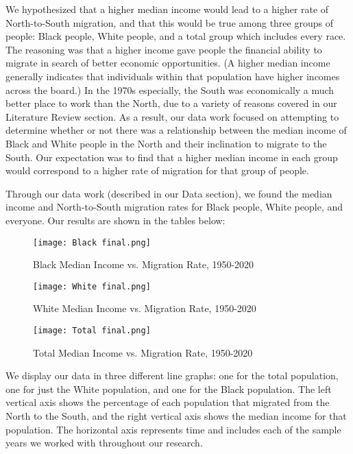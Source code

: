 \documentclass[12pt]{article}
\begin{document}
We hypothesized that a higher median income would lead to a higher rate of North-to-South migration, and that this would be true among three groups of people: Black people, White people, and a total group which includes every race. The reasoning was that a higher income gave people the financial ability to migrate in search of better economic opportunities. (A higher median income generally indicates that individuals within that population have higher incomes across the board.) In the 1970s especially, the South was economically a much better place to work than the North, due to a variety of reasons covered in our Literature Review section. As a result, our data work focused on attempting to determine whether or not there was a relationship between the median income of Black and White people in the North and their inclination to migrate to the South. Our expectation was to find that a higher median income in each group would correspond to a higher rate of migration for that group of people.  

Through our data work (described in our Data section), we found the median income and North-to-South migration rates for Black people, White people, and everyone. Our results are shown in the tables below:  

 \begin{figure}[h]
     \centering
     \texttt{[image: Black final.png]}
     \caption{Black Median Income vs. Migration Rate, 1950-2020}
     \label{Figure 1}
 \end{figure}

 \begin{figure}[h]
     \centering
     \texttt{[image: White final.png]}
     \caption{White Median Income vs. Migration Rate, 1950-2020}
     \label{Figure 2}
 \end{figure}

\begin{figure}[h]
    \centering
    \texttt{[image: Total final.png]}
    \caption{Total Median Income vs. Migration Rate, 1950-2020}
    \label{Figure 3}
\end{figure}

We display our data in three different line graphs: one for the total population, one for just the White population, and one for the Black population. The left vertical axis shows the percentage of each population that migrated from the North to the South, and the right vertical axis shows the median income for that population. The horizontal axis represents time and includes each of the sample years we worked with throughout our research. 
\end{document}
